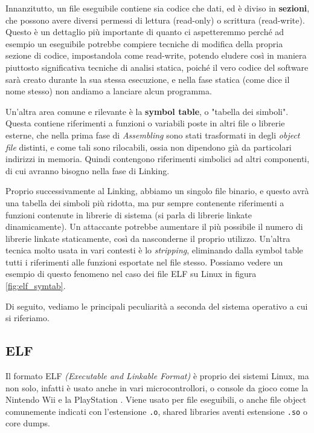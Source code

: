 Innanzitutto, un file eseguibile contiene sia codice che dati, ed è diviso in \textbf{sezioni}, che possono avere diversi permessi di lettura (read-only) o scrittura (read-write).
Questo è un dettaglio più importante di quanto ci aspetteremmo perché ad esempio un eseguibile potrebbe compiere tecniche di modifica della propria sezione di codice, impostandola come read-write, potendo eludere così in maniera piuttosto significativa tecniche di analisi statica, poiché il vero codice del software sarà creato durante la sua stessa esecuzione, e nella fase statica (come dice il nome stesso) non andiamo a lanciare alcun programma.

Un'altra area comune e rilevante è la \textbf{symbol table}, o "tabella dei simboli".
Questa contiene riferimenti a funzioni o variabili poste in altri file o librerie esterne, che nella prima fase di \emph{Assembling} sono stati trasformati in degli \emph{object file} distinti,
e come tali sono rilocabili, ossia non dipendono già da particolari indirizzi in memoria.
Quindi contengono riferimenti simbolici ad altri componenti, di cui avranno bisogno nella fase di Linking.

Proprio successivamente al Linking, abbiamo un singolo file binario, e questo avrà una tabella dei simboli più ridotta, ma pur sempre contenente riferimenti a funzioni contenute in librerie di sistema (si parla di librerie linkate dinamicamente).
Un attaccante potrebbe aumentare il più possibile il numero di librerie linkate staticamente, così da nasconderne il proprio utilizzo.
Un'altra tecnica molto usata in vari contesti è lo \emph{stripping}, eliminando dalla symbol table tutti i riferimenti alle funzioni esportate nel file stesso. Possiamo vedere un esempio di questo fenomeno nel caso dei file ELF su Linux in figura \ref{fig:elf_symtab}.

Di seguito, vediamo le principali peculiarità a seconda del sistema operativo a cui si riferiamo.

\subsection{ELF}
Il formato ELF \emph{(Executable and Linkable Format)} è proprio dei sistemi Linux, ma non solo, infatti è usato anche in vari microcontrollori, o console da gioco come la Nintendo Wii e la PlayStation \cite{forensic_friday_execs}.
Viene usato per file eseguibili, o anche file object comunemente indicati con l'estensione \texttt{.o}, shared libraries aventi estensione \texttt{.so} o core dumps.

